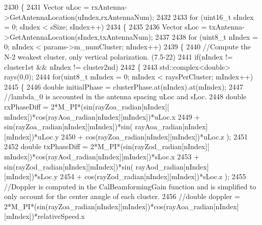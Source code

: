 \begin{DoxyCode}
2430         \{
2431                 Vector uLoc = rxAntenna->GetAntennaLocation(uIndex,rxAntennaNum);
2432 
2433                 \textcolor{keywordflow}{for} (uint16\_t sIndex = 0; sIndex < sSize; sIndex++)
2434                 \{
2435 
2436                         Vector sLoc = txAntenna->GetAntennaLocation(sIndex,txAntennaNum);
2437 
2438                         \textcolor{keywordflow}{for} (uint8\_t nIndex = 0; nIndex < params->m\_numCluster; nIndex++)
2439                         \{
2440                                 \textcolor{comment}{//Compute the N-2 weakest cluster, only vertical polarization. (7.5-22)}
2441                                 \textcolor{keywordflow}{if}(nIndex != cluster1st && nIndex != cluster2nd)
2442                                 \{
2443                                         std::complex<double> rays(0,0);
2444                                         \textcolor{keywordflow}{for}(uint8\_t mIndex = 0; mIndex < raysPerCluster; mIndex++)
2445                                         \{
2446                                                 \textcolor{keywordtype}{double} initialPhase = clusterPhase.at(nIndex).at(mIndex);
2447                                                 \textcolor{comment}{//lambda\_0 is accounted in the antenna spacing uLoc and
       sLoc.}
2448                                                 \textcolor{keywordtype}{double} rxPhaseDiff = 2*M\_PI*(sin(rayZoa\_radian[nIndex][
      mIndex])*cos(rayAoa\_radian[nIndex][mIndex])*uLoc.x
2449                                                                 + sin(rayZoa\_radian[nIndex][mIndex])*sin(
      rayAoa\_radian[nIndex][mIndex])*uLoc.y
2450                                                                 + cos(rayZoa\_radian[nIndex][mIndex])*uLoc.z
      );
2451 
2452                                                 \textcolor{keywordtype}{double} txPhaseDiff = 2*M\_PI*(sin(rayZod\_radian[nIndex][
      mIndex])*cos(rayAod\_radian[nIndex][mIndex])*sLoc.x
2453                                                                 + sin(rayZod\_radian[nIndex][mIndex])*sin(
      rayAod\_radian[nIndex][mIndex])*sLoc.y
2454                                                                 + cos(rayZod\_radian[nIndex][mIndex])*sLoc.z
      );
2455                                                 \textcolor{comment}{//Doppler is computed in the CalBeamformingGain function
       and is simplified to only account for the center anngle of each cluster.}
2456                                                 \textcolor{comment}{//double doppler =
       2*M\_PI*(sin(rayZoa\_radian[nIndex][mIndex])*cos(rayAoa\_radian[nIndex][mIndex])*relativeSpeed.x}

\end{DoxyCode}
